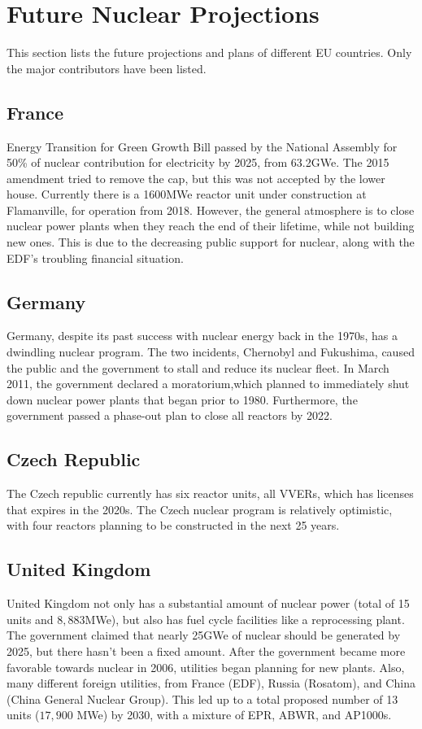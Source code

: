 \section{Future Nuclear Projections}
This section lists the future projections and plans of
different EU countries. Only the major contributors have been listed.

\subsection{France}
Energy Transition for Green Growth Bill passed by the National Assembly for 50\% of
nuclear contribution for electricity by 2025, from 63.2GWe. The 2015 amendment tried to remove
the cap, but this was not accepted by the lower house. Currently there is a
1600MWe reactor unit under construction at Flamanville, for operation from 2018.
However, the general atmosphere is to close nuclear power plants when they reach the end
of their lifetime, while not building new ones. This is due to the decreasing
public support for nuclear, along with the \gls{EDF}'s troubling financial situation.

\subsection{Germany}
Germany, despite its past success with nuclear energy back in the 1970s,
has a dwindling nuclear program. The two incidents, Chernobyl and Fukushima,
caused the public and the government to stall and reduce its nuclear fleet.
In March 2011, the government declared a moratorium,which planned to immediately
shut down nuclear power plants that began prior to 1980. Furthermore, the government
passed a phase-out plan to close all reactors by 2022.

\subsection{Czech Republic}
The Czech republic currently has six reactor units, all \gls{VVER}s, which
has licenses that expires in the 2020s. The Czech nuclear program is 
relatively optimistic, with four reactors planning to be constructed in the
next 25 years.

\subsection{United Kingdom}
United Kingdom not only has a substantial amount of nuclear power (total of 15 units
and $8,883$MWe), but also has fuel cycle facilities like a reprocessing plant. The government
claimed that nearly 25GWe of nuclear should be generated by 2025, but there hasn't been
a fixed amount. After the government became more favorable towards nuclear in 2006, utilities
began planning for new plants. Also, many different foreign utilities, from France (EDF),
Russia (Rosatom), and China (China General Nuclear Group). This led up to a total proposed
number of 13 units ($17,900$ MWe) by 2030, with a mixture of EPR, ABWR, and AP1000s.


